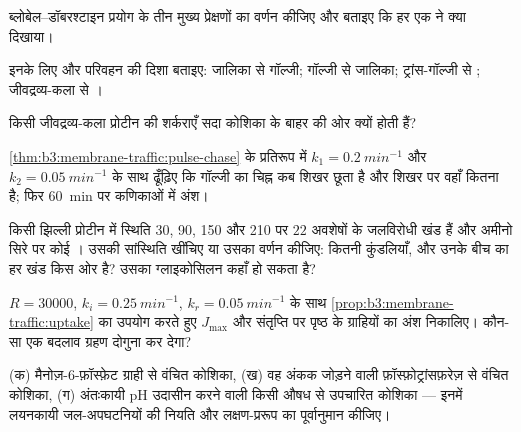 \begin{exercise}[$\star$]\label{exo:b3:membrane-traffic:2}
ब्लोबेल--डॉबरश्टाइन प्रयोग के तीन मुख्य प्रेक्षणों का वर्णन कीजिए और
बताइए कि हर एक ने क्या दिखाया।
\end{exercise}

\begin{exercise}[$\star$]\label{exo:b3:membrane-traffic:3}
इनके लिए  और परिवहन की दिशा बताइए: जालिका से गॉल्जी; गॉल्जी से
जालिका; ट्रांस-गॉल्जी से ; जीवद्रव्य-कला से ।
\end{exercise}

\begin{exercise}[$\star$]\label{exo:b3:membrane-traffic:4}
किसी जीवद्रव्य-कला प्रोटीन की शर्कराएँ सदा कोशिका के बाहर की ओर क्यों
होती हैं?
\end{exercise}

\begin{exercise}[$\star\star$]\label{exo:b3:membrane-traffic:5}
\cref{thm:b3:membrane-traffic:pulse-chase} के प्रतिरूप में $k_{1}
= \qty{0.2}{min^{-1}}$ और $k_{2} = \qty{0.05}{min^{-1}}$ के साथ ढूँढ़िए
कि गॉल्जी का चिह्न कब शिखर छूता है और शिखर पर वहाँ कितना है; फिर
\qty{60}{min} पर कणिकाओं में अंश।
\end{exercise}

\begin{exercise}[$\star\star$]\label{exo:b3:membrane-traffic:6}
किसी झिल्ली प्रोटीन में स्थिति 30, 90, 150 और 210 पर $22$ अवशेषों के
जलविरोधी खंड हैं और अमीनो सिरे पर कोई ।
उसकी सांस्थिति खींचिए या उसका वर्णन कीजिए: कितनी कुंडलियाँ, और उनके
बीच का हर खंड किस ओर है? उसका ग्लाइकोसिलन कहाँ हो सकता है?
\end{exercise}

\begin{exercise}[$\star\star$]\label{exo:b3:membrane-traffic:7}
$R = \num{30000}$,
$k_{i} = \qty{0.25}{min^{-1}}$, $k_{r} = \qty{0.05}{min^{-1}}$ के साथ
\cref{prop:b3:membrane-traffic:uptake} का उपयोग करते हुए
$J_{\max}$ और संतृप्ति पर पृष्ठ के ग्राहियों का अंश निकालिए।
कौन-सा एक बदलाव ग्रहण दोगुना कर देगा?
\end{exercise}

\begin{exercise}[$\star\star$]\label{exo:b3:membrane-traffic:8}
(क) मैनोज़-6-फ़ॉस्फ़ेट ग्राही से वंचित कोशिका, (ख) वह अंकक जोड़ने वाली
फ़ॉस्फ़ोट्रांसफ़रेज़ से वंचित कोशिका, (ग) अंतःकायी pH उदासीन करने वाली
किसी औषध से उपचारित कोशिका --- इनमें लयनकायी जल-अपघटनियों की नियति और
लक्षण-प्ररूप का पूर्वानुमान कीजिए।
\end{exercise}

